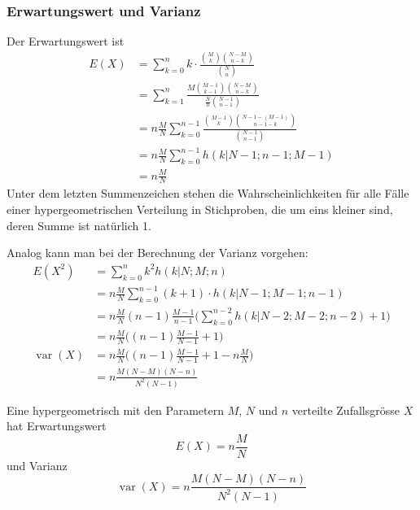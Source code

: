 \subsubsection{Erwartungswert und Varianz}
Der Erwartungswert ist
\begin{align*}
E(X)
&=\sum_{k=0}^n k\cdot\frac{\binom{M}{k}\binom{N-M}{n-k}}{\binom{N}{n}}\\
&=\sum_{k=1}^n \frac{M\binom{M-1}{k-1}\binom{N-M}{n-k}}{\frac{N}{n}\binom{N-1}{n-1}}\\
&=n\frac{M}{N}\sum_{k=0}^{n-1} \frac{\binom{M-1}{k}\binom{N-1-(M-1)}{n-1-k}}{\binom{N-1}{n-1}}\\
&=n\frac{M}{N}\sum_{k=0}^{n-1}h(k|N-1;n-1;M-1)\\
&=n\frac{M}{N}
\end{align*}
Unter dem letzten Summenzeichen stehen die Wahrscheinlichkeiten für alle
Fälle einer hypergeometrischen Verteilung in Stichproben, die um eins kleiner
sind, deren Summe ist natürlich 1.

Analog kann man bei der Berechnung der Varianz vorgehen:
\begin{align*}
E(X^2)
&=\sum_{k=0}^n k^2h(k|N;M;n)\\
&=n\frac{M}{N}\sum_{k=0}^{n-1} (k+1)\cdot h(k|N-1;M-1;n-1)\\
&=n\frac{M}{N}(n-1)\frac{M-1}{n-1}\biggl(\sum_{k=0}^{n-2} h(k|N-2;M-2;n-2)+1\biggr)\\
&=n\frac{M}{N}\biggl((n-1)\frac{M-1}{N-1}+1\biggr)\\
\operatorname{var}(X)
&=n\frac{M}{N}\biggl((n-1)\frac{M-1}{N-1}+1-n\frac{M}{N}\biggr)\\
&=n\frac{M(N-M)(N-n)}{N^2(N-1)}
\end{align*}
\begin{satz}
Eine hypergeometrisch mit den Parametern $M$, $N$ und $n$
verteilte Zufallsgrösse $X$
hat Erwartungswert
\[
E(X)=n\frac{M}{N}
\]
und Varianz
\[
\operatorname{var}(X)=n\frac{M(N-M)(N-n)}{N^2(N-1)}
\]
\end{satz}
